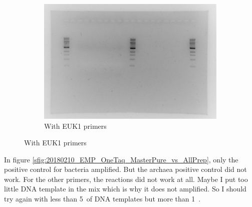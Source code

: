 \begin{figure}[H]
\begin{subfigure}[b]{0.3\textwidth}
    \end{subfigure}
    ~ 
    \begin{subfigure}[b]{0.3\textwidth}
        \includegraphics[width=\textwidth]{graphics/pic/20180210_EUK1_OneTaq_MasterPure_vs_AllPrep.png}
        \caption{With EUK1 primers}
        \label{sfig:20180210_EUK1_OneTaq_MasterPure_vs_AllPrep}
    \end{subfigure}
\end{figure}

In figure \ref{sfig:20180210_EMP_OneTaq_MasterPure_vs_AllPrep}, only the positive control for bacteria amplified. But the archaea positive control did not work. For the other primers, the reactions did not work at all. Maybe I put too little DNA template in the mix which is why it does not amplified. So I should try again with less than 5~\uL of DNA templates but more than 1~\uL.
